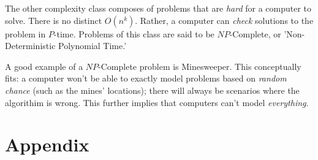 \documentclass{article}
\begin{document}
The other complexity class composes of problems that are \textit{hard} for a computer to solve. There is no distinct $O(n^{k})$. Rather, a computer can \textit{check} solutions to the problem in $P$-time. Problems of this class are said to be $NP$-Complete, or 'Non-Deterministic Polynomial Time.' %

A good example of a $NP$-Complete problem is Minesweeper. This conceptually fits: a computer won't be able to exactly model problems based on \textit{random chance} (such as the mines' locations); there will always be scenarios where the algorithim is wrong.\cite{mine} This further implies that computers can't model \textit{everything}.
\section{Appendix} 


\medskip



\end{document}
